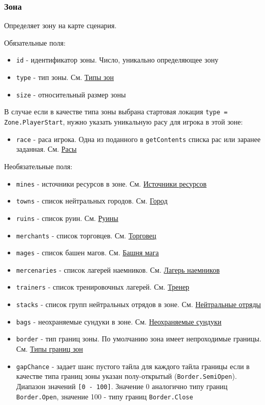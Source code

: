 \subsubsection{Зона}
\label{zone}
Определяет зону на карте сценария.

Обязательные поля:
\begin{itemize}
\item \texttt{id} - идентификатор зоны. Число, уникально определяющее зону
\item \texttt{type} - тип зоны. См. \hyperref[zoneTypes]{Типы зон}
\item \texttt{size} - относительный размер зоны
\end{itemize}

В случае если в качестве типа зоны выбрана стартовая локация \texttt{type = Zone.PlayerStart}, нужно указать уникальную расу для игрока в этой зоне:
\begin{itemize}
\item \texttt{race} - раса игрока. Одна из поданного в \texttt{getContents} списка рас или заранее заданная. См. \hyperref[raceTypes]{Расы}
\end{itemize}

Необязательные поля:
\begin{itemize}
\item \texttt{mines} - источники ресурсов в зоне. См. \hyperref[crystals]{Источники ресурсов}
\item \texttt{towns} - список нейтральных городов. См. \hyperref[city]{Город}
\item \texttt{ruins} - список руин. См. \hyperref[ruin]{Руины}
\item \texttt{merchants} - список торговцев. См. \hyperref[merchant]{Торговец}
\item \texttt{mages} - список башен магов. См. \hyperref[mage]{Башня мага}
\item \texttt{mercenaries} - список лагерей наемников. См. \hyperref[mercenary]{Лагерь наемников}
\item \texttt{trainers} - список тренировочных лагерей. См. \hyperref[trainer]{Тренер}
\item \texttt{stacks} - список групп нейтральных отрядов в зоне. См. \hyperref[neutralStacks]{Нейтральные отряды}
\item \texttt{bags} - неохраняемые сундуки в зоне. См. \hyperref[bags]{Неохраняемые сундуки}
\item \texttt{border} - тип границ зоны. По умолчанию зона имеет непроходимые границы. См. \hyperref[borderTypes]{Типы границ зон}
\item \texttt{gapChance} - задает шанс пустого тайла для каждого тайла границы если в качестве типа границ зоны указан полу-открытый (\texttt{Border.SemiOpen}). Диапазон значений \texttt{[0 - 100]}. Значение 0 аналогично типу границ \texttt{Border.Open}, значение 100 - типу границ \texttt{Border.Close}
\end{itemize}

